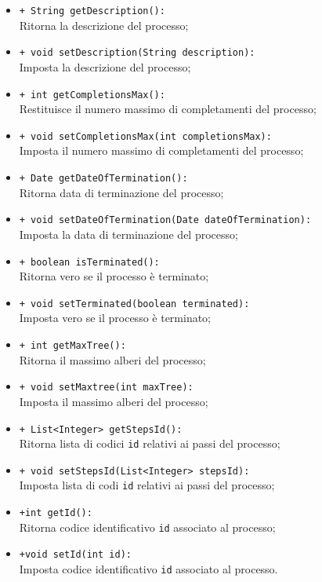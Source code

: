 \begin{flushleft}
\begin{itemize}
\begin{sloppypar}
\begin{itemize}
\item \texttt{+ String getDescription():}\\ Ritorna la descrizione del processo;
\item \texttt{+ void setDescription(String description):}\\ Imposta la descrizione del processo;
\item \texttt{+ int getCompletionsMax():}\\ Restituisce il numero massimo di completamenti del processo;
\item \texttt{+ void setCompletionsMax(int completionsMax):}\\ Imposta il numero massimo di completamenti del processo;
\item \texttt{+ Date getDateOfTermination():}\\ Ritorna data di terminazione del processo;
\item \texttt{+ void setDateOfTermination(Date dateOfTermination):}\\ Imposta la data di terminazione del processo;
\item \texttt{+ boolean isTerminated():}\\ Ritorna vero se il processo è terminato;
\item \texttt{+ void setTerminated(boolean terminated):}\\ Imposta vero se il processo è terminato;
\item \texttt{+ int getMaxTree():}\\ Ritorna il massimo alberi del processo;
\item \texttt{+ void setMaxtree(int maxTree):}\\ Imposta il massimo alberi del processo;
\item \texttt{+ List<Integer> getStepsId():}\\ Ritorna lista di codici \texttt{id} relativi ai passi del processo;
\item \texttt{+ void setStepsId(List<Integer> stepsId):}\\ Imposta lista di codi \texttt{id} relativi ai passi del processo;
\item \texttt{+int getId():}\\ Ritorna codice identificativo \texttt{id} associato al processo;
\item \texttt{+void setId(int id):}\\ Imposta codice identificativo \texttt{id} associato al processo.
\end{itemize}
\end{sloppypar}
\end{itemize}
\end{flushleft}

